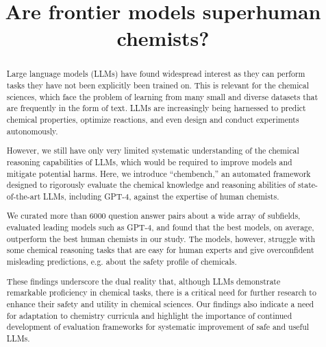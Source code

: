 \documentclass[11pt, oneside]{article}
\title{\textsf{Are frontier models superhuman chemists?}}
\begin{document}
\maketitle

\begin{abstract}
    Large language models (LLMs) have found widespread interest as they can perform tasks they have not been explicitly been trained on. 
    This is relevant for the chemical sciences, which face the problem of learning from many small and diverse datasets that are frequently in the form of text.
    LLMs are increasingly being harnessed to predict chemical properties, optimize reactions, and even design and conduct experiments autonomously.

    However, we still have only very limited systematic understanding of the chemical reasoning capabilities of LLMs, which would be required to improve models and mitigate potential harms. 
    Here, we introduce \enquote{chembench,} an automated framework designed to rigorously evaluate the chemical knowledge and reasoning abilities of state-of-the-art LLMs, including GPT-4, against the expertise of human chemists.

    We curated more than 6000 question answer pairs about a wide array of subfields, evaluated leading models such as GPT-4, and found that the best models, on average, outperform the best human chemists in our study. 
    The models, however, struggle with some chemical reasoning tasks that are easy for human experts and give overconfident misleading predictions, e.g. about the safety profile of chemicals. 

    These findings underscore the dual reality that, although LLMs demonstrate remarkable proficiency in chemical tasks, there is a critical need for further research to enhance their safety and utility in chemical sciences.
    Our findings also indicate a need for adaptation to chemistry curricula and highlight the importance of continued development of evaluation frameworks for systematic improvement of safe and useful LLMs.
\end{abstract}

\clearpage
\end{document}
